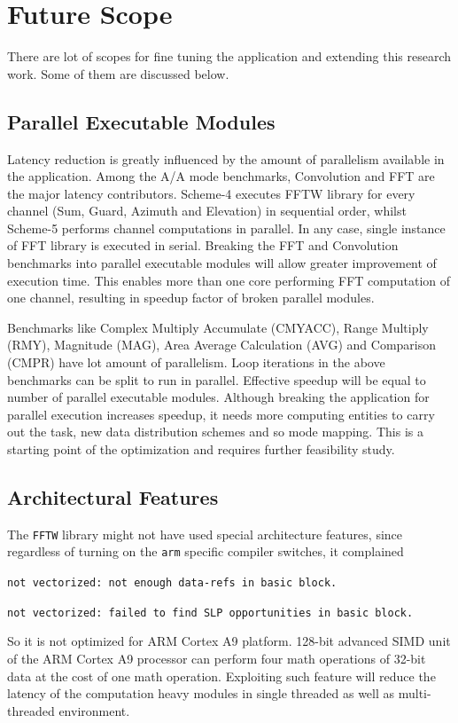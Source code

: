 \section{Future Scope}
There are lot of scopes for fine tuning the application and extending this research work. Some of them are discussed below.

\subsection{Parallel Executable Modules}
Latency reduction is greatly influenced by the amount of parallelism available in the application. Among the A/A mode benchmarks, Convolution and FFT are the major latency contributors. Scheme-4 executes FFTW library for every channel (Sum, Guard, Azimuth and Elevation) in sequential order, whilst Scheme-5 performs channel computations in parallel. In any case, single instance of FFT library is executed in serial. Breaking the FFT and Convolution benchmarks into parallel executable modules will allow greater improvement of execution time. This enables more than one core performing FFT computation of one channel, resulting in speedup factor of broken parallel modules. \vspace*{0.2cm}

Benchmarks like Complex Multiply Accumulate (CMYACC), Range Multiply (RMY), Magnitude (MAG), Area Average Calculation (AVG) and Comparison (CMPR) have lot amount of parallelism. Loop iterations in the above benchmarks can be split to run in parallel. Effective speedup will be equal to number of parallel executable modules. Although breaking the application for parallel execution increases speedup, it needs more computing entities to carry out the task, new data distribution schemes and so mode mapping. This is a starting point of the optimization and requires further feasibility study.

\subsection{Architectural Features}
The \verb|FFTW| library might not have used special architecture features, since regardless of turning on the \verb|arm| specific compiler switches, it complained 
\begin{compactitem}
	\item[] \verb|not vectorized: not enough data-refs in basic block.|
	\item[] \verb|not vectorized: failed to find SLP opportunities in basic block.|
\end{compactitem}
So it is not optimized for ARM Cortex A9 platform. 128-bit advanced SIMD unit of the ARM Cortex A9 processor can perform four math operations of 32-bit data at the cost of one math operation. Exploiting such feature will reduce the latency of the computation heavy modules in single threaded as well as multi-threaded environment.

